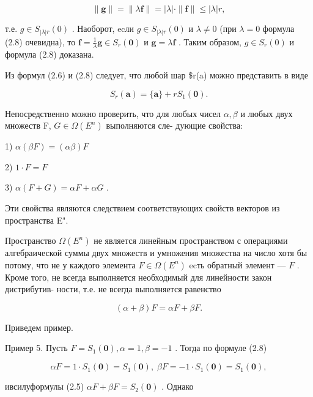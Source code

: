 \documentclass[8pt]{extarticle}
\begin{document}
\[
\parallel \mathbf{g}\parallel  = \parallel \lambda \mathbf{f}\parallel  = \left| \lambda \right|  \cdot  \parallel \mathbf{f}\parallel  \leq  \left| \lambda \right| r,
\]

т.е. \(g \in  {S}_{\left| \lambda \right| r}\left( 0\right)\) . Наоборот, ecли \(g \in  {S}_{\left| \lambda \right| r}\left( 0\right)\) и \(\lambda  \neq  0\) (при \(\lambda  = 0\) формула (2.8) очевидна), то \(\mathbf{f} = \frac{1}{\lambda }\mathbf{g} \in  {S}_{r}\left( \mathbf{0}\right)\) и \(\mathbf{g} = \lambda \mathbf{f}\) . Таким образом, \(g \in  {S}_{r}\left( 0\right)\) и формула (2.8) доказана.

Из формул (2.6) и (2.8) следует, что любой шар \$r(a) можно представить в виде

\[
{S}_{r}\left( \mathbf{a}\right)  = \{ \mathbf{a}\}  + r{S}_{1}\left( \mathbf{0}\right) .
\]

Непосредственно можно проверить, что для любых чисел \(\alpha ,\beta\) и любых двух множеств F, \(G \in  \Omega \left( {E}^{n}\right)\) выполняются сле- дующие свойства:

1) \(\alpha \left( {\beta F}\right)  = \left( {\alpha \beta }\right) F\)

2) \(1 \cdot  F = F\)

3) \(\alpha \left( {F + G}\right)  = {\alpha F} + {\alpha G}\) .

Эти свойства являются следствием соответствующих свойств векторов из пространства E".

Пространство \(\Omega \left( {E}^{n}\right)\) не является линейным пространством с операциями алгебраической суммы двух множеств и умножения множества на число хотя бы потому, что не у каждого элемента \(F \in  \Omega \left( {E}^{n}\right)\) ecть обратный элемент — \(F\) . Кроме того, не всегда выполняется необходимый для линейности закон дистрибутив- ности, т.е. не всегда выполняется равенство

\[
\left( {\alpha  + \beta }\right) F = {\alpha F} + {\beta F}. \tag{2.9}
\]

Приведем пример.

Пример 5. Пусть \(F = {S}_{1}\left( \mathbf{0}\right) ,\alpha  = 1,\beta  =  - 1\) . Тогда по формуле (2.8)

\[
{\alpha F} = 1 \cdot  {S}_{1}\left( \mathbf{0}\right)  = {S}_{1}\left( \mathbf{0}\right) ,\;{\beta F} =  - 1 \cdot  {S}_{1}\left( \mathbf{0}\right)  = {S}_{1}\left( \mathbf{0}\right) ,
\]

ивсилуформулы (2.5) \({\alpha F} + {\beta F} = {S}_{2}\left( \mathbf{0}\right)\) . Однако
\end{document}
